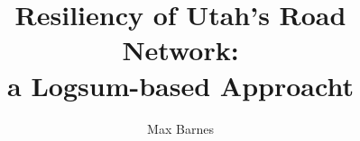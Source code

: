 \documentclass[12pt,twoside]{report}%
\begin{document}
\title{Resiliency of Utah's Road Network:\\a Logsum-based Approacht}%
\author{Max Barnes}

\showBYUHeader




\cleardoublepage

\appendix


\end{document}
